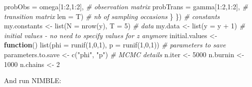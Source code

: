 \documentclass[
  12pt,
]{krantz}
\newenvironment{Shaded}{\begin{snugshade}}{\end{snugshade}}
\newcommand{\AttributeTok}[1]{\textcolor[rgb]{0.77,0.63,0.00}{#1}}
\newcommand{\CommentTok}[1]{\textcolor[rgb]{0.56,0.35,0.01}{\textit{#1}}}
\newcommand{\ControlFlowTok}[1]{\textcolor[rgb]{0.13,0.29,0.53}{\textbf{#1}}}
\newcommand{\DecValTok}[1]{\textcolor[rgb]{0.00,0.00,0.81}{#1}}
\newcommand{\FunctionTok}[1]{\textcolor[rgb]{0.00,0.00,0.00}{#1}}
\newcommand{\NormalTok}[1]{#1}
\newcommand{\OtherTok}[1]{\textcolor[rgb]{0.56,0.35,0.01}{#1}}
\newcommand{\SpecialCharTok}[1]{\textcolor[rgb]{0.00,0.00,0.00}{#1}}
\newcommand{\StringTok}[1]{\textcolor[rgb]{0.31,0.60,0.02}{#1}}
\begin{document}
\begin{Shaded}
\begin{Highlighting}[]
                    \AttributeTok{probObs =}\NormalTok{ omega[}\DecValTok{1}\SpecialCharTok{:}\DecValTok{2}\NormalTok{,}\DecValTok{1}\SpecialCharTok{:}\DecValTok{2}\NormalTok{], }\CommentTok{\# observation matrix}
                    \AttributeTok{probTrans =}\NormalTok{ gamma[}\DecValTok{1}\SpecialCharTok{:}\DecValTok{2}\NormalTok{,}\DecValTok{1}\SpecialCharTok{:}\DecValTok{2}\NormalTok{], }\CommentTok{\# transition matrix}
                    \AttributeTok{len =}\NormalTok{ T) }\CommentTok{\# nb of sampling occasions}
\NormalTok{  \}}
\NormalTok{\})}
\CommentTok{\# constants}
\NormalTok{my.constants }\OtherTok{\textless{}{-}} \FunctionTok{list}\NormalTok{(}\AttributeTok{N =} \FunctionTok{nrow}\NormalTok{(y), }\AttributeTok{T =} \DecValTok{5}\NormalTok{)}
\CommentTok{\# data}
\NormalTok{my.data }\OtherTok{\textless{}{-}} \FunctionTok{list}\NormalTok{(}\AttributeTok{y =}\NormalTok{ y }\SpecialCharTok{+} \DecValTok{1}\NormalTok{)}
\CommentTok{\# initial values {-} no need to specify values for z anymore}
\NormalTok{initial.values }\OtherTok{\textless{}{-}} \ControlFlowTok{function}\NormalTok{() }\FunctionTok{list}\NormalTok{(}\AttributeTok{phi =} \FunctionTok{runif}\NormalTok{(}\DecValTok{1}\NormalTok{,}\DecValTok{0}\NormalTok{,}\DecValTok{1}\NormalTok{),}
                                  \AttributeTok{p =} \FunctionTok{runif}\NormalTok{(}\DecValTok{1}\NormalTok{,}\DecValTok{0}\NormalTok{,}\DecValTok{1}\NormalTok{))}
\CommentTok{\# parameters to save}
\NormalTok{parameters.to.save }\OtherTok{\textless{}{-}} \FunctionTok{c}\NormalTok{(}\StringTok{"phi"}\NormalTok{, }\StringTok{"p"}\NormalTok{)}
\CommentTok{\# MCMC details}
\NormalTok{n.iter }\OtherTok{\textless{}{-}} \DecValTok{5000}
\NormalTok{n.burnin }\OtherTok{\textless{}{-}} \DecValTok{1000}
\NormalTok{n.chains }\OtherTok{\textless{}{-}} \DecValTok{2}
\end{Highlighting}
\end{Shaded}

And run NIMBLE:
\end{document}
